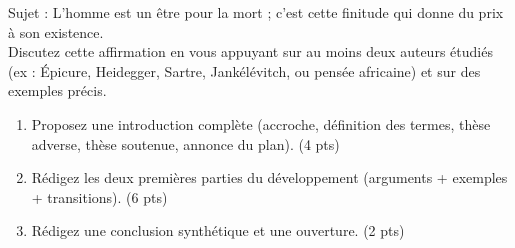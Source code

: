 \documentclass[11pt]{article}
\begin{document}
\begin{exercice}
Sujet : \og L'homme est un être pour la mort ; c'est cette finitude qui donne du prix à son existence. \fg{} \\
Discutez cette affirmation en vous appuyant sur au moins deux auteurs étudiés (ex : Épicure, Heidegger, Sartre, Jankélévitch, ou pensée africaine) et sur des exemples précis.
\begin{enumerate}
    \item Proposez une introduction complète (accroche, définition des termes, thèse adverse, thèse soutenue, annonce du plan). (4 pts)
    \item Rédigez les deux premières parties du développement (arguments + exemples + transitions). (6 pts)
    \item Rédigez une conclusion synthétique et une ouverture. (2 pts)
\end{enumerate}
\end{exercice}
\end{document}
